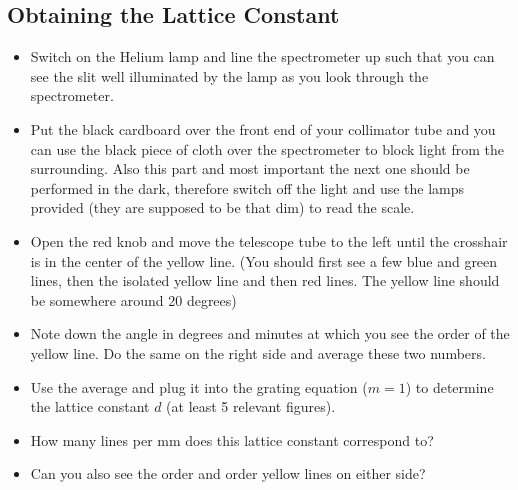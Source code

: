 \subsection{Obtaining the Lattice Constant}
\begin{itemize}
\item Switch on the Helium lamp and line the spectrometer up such that you can see the slit well illuminated by the lamp as you look through the spectrometer.

\item Put the black cardboard over the front end of your collimator tube and you can use the black piece of cloth over the spectrometer to block light from the surrounding. Also this part and most important the next one should be performed in the dark, therefore switch off the light and use the lamps provided (they are supposed to be that dim) to read the scale.

\item Open the red knob and move the telescope tube to the left until the crosshair is in the center of the yellow line. (You should first see a few blue and green lines, then the isolated yellow line and then red lines. The yellow line should be somewhere around 20 degrees)

\item Note down the angle in degrees and minutes at which you see the  order of the yellow line. Do the same on the right side and average these two numbers.

\item Use the average and plug it into the grating equation ($m=1$) to determine the lattice constant $d$ (at least 5 relevant figures).

\item How many lines per mm does this lattice constant correspond to?

\item Can you also see the  order and  order yellow lines on either side?
\end{itemize}

